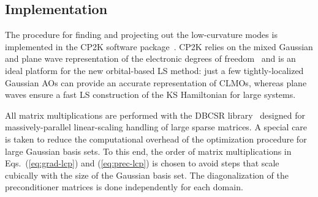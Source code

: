 \documentclass[aps,prl,twocolumn,reprint,amsmath,amssymb]{revtex4-1}
\begin{document}



\subsection{Implementation}

The procedure for finding and projecting out the low-curvature modes is implemented in the CP2K software package~\cite{cp2kgeneral}. CP2K relies on the mixed Gaussian and plane wave representation of the electronic degrees of freedom~\cite{vandevondele2005quickstep} and is an ideal platform for the new orbital-based LS method: just a few tightly-localized Gaussian AOs can provide an accurate representation of CLMOs, whereas plane waves ensure a fast LS construction of the KS Hamiltonian for large systems.

All matrix multiplications are performed with the DBCSR library~\cite{borvstnik2014sparse} designed for massively-parallel linear-scaling handling of large sparse matrices. 
A special care is taken to reduce the computational overhead of the optimization procedure for large Gaussian basis sets. 
To this end, the order of matrix multiplications in Eqs.~(\ref{eq:grad-lcp}) and (\ref{eq:prec-lcp}) is chosen to avoid steps that scale cubically with the size of the Gaussian basis set. 
The diagonalization of the preconditioner matrices is done independently for each domain. 
\end{document}
